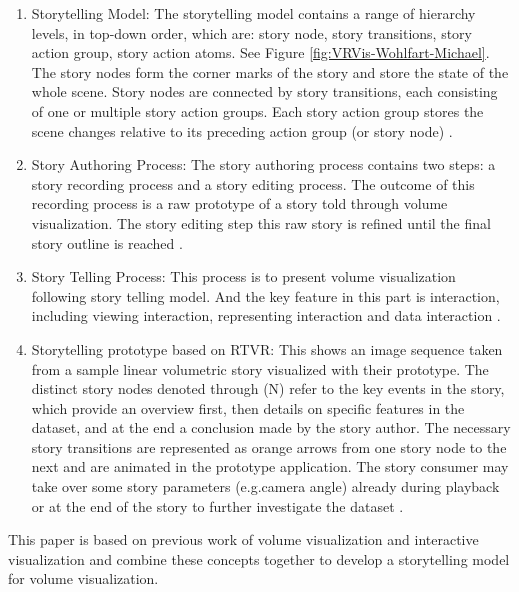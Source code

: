 \documentclass{egpubl}
\begin{document}
\begin{enumerate}
\item Storytelling Model: The storytelling model contains a range of hierarchy levels, in top-down order, which are: story node, story transitions, story action group, story action atoms. See Figure \ref{fig:VRVis-Wohlfart-Michael}. The story nodes form the corner marks of the story and store the state of the whole scene. Story nodes are connected by story transitions, each consisting of one or multiple story action groups. Each story action group stores the scene changes relative to its preceding action group (or story node) \cite{wohlfat}.

\item Story Authoring Process: The story authoring process contains two steps: a story recording process and a story editing process. The outcome of this recording process is a raw prototype of a story told through volume visualization. The story editing step this raw story is refined until the final story outline is reached \cite{wohlfat}.
\item Story Telling Process: This process is to present volume visualization following story telling model. And the key feature in this part is interaction, including viewing interaction, representing interaction and data interaction \cite{wohlfat}.
\item Storytelling prototype based on RTVR: This shows an image sequence taken from a sample linear volumetric story visualized with their prototype. The distinct story nodes denoted through (N) refer to the key events in the story, which provide an overview first, then details on specific features in the dataset, and at the end a conclusion made by the story author. The necessary story transitions are represented as orange arrows from one story node to the next and are animated in the prototype application. The story consumer may take over some story parameters (e.g.camera angle) already during playback or at the end of the story to further investigate the dataset \cite{wohlfat}.
\end{enumerate}
This paper is based on previous work of volume visualization \cite{Amy,robert,Ivan} and interactive visualization \cite{merlin}and combine these concepts together to develop a storytelling model for volume visualization.
\end{document}
